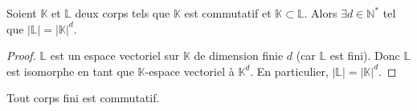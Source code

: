 






	\begin{lemma}
		\label{theoreme-de-wedderburn-1}
		Soient $\mathbb{K}$ et $\mathbb{L}$ deux corps tels que $\mathbb{K}$ est commutatif et $\mathbb{K} \subset \mathbb{L}$. Alors $\exists d \in \mathbb{N}^*$ tel que $|\mathbb{L}| = |\mathbb{K}|^d$.
	\end{lemma}

	\begin{proof}
		$\mathbb{L}$ est un espace vectoriel sur $\mathbb{K}$ de dimension finie $d$ (car $\mathbb{L}$ est fini). Donc $\mathbb{L}$ est isomorphe en tant que $\mathbb{K}$-espace vectoriel à $\mathbb{K}^d$. En particulier, $|\mathbb{L}| = |\mathbb{K}|^d$.
	\end{proof}

	\begin{theorem}[Wedderburn]
		Tout corps fini est commutatif.
	\end{theorem}

